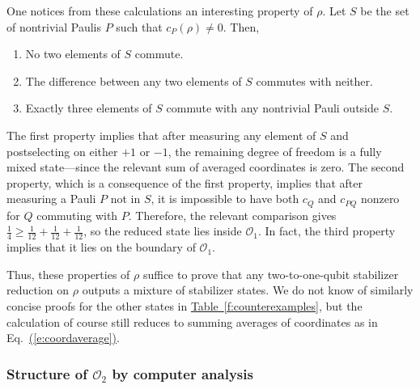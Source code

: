 \documentclass[11pt]{article}
\theoremstyle{note}
\newcommand{\eqnref}[1]{\hyperref[#1]{{(\ref*{#1})}}}
\newcommand{\tabref}[1]{\hyperref[#1]{{Table~\ref*{#1}}}}
\begin{document}
One notices from these calculations an interesting property of $\rho$.  Let $S$ be the set of nontrivial Paulis $P$ such that $c_P(\rho) \neq 0$.  Then,
\begin{enumerate}
\item No two elements of $S$ commute.
\item The difference between any two elements of $S$ commutes with neither.  
\item Exactly three elements of $S$ commute with any nontrivial Pauli outside $S$.
\end{enumerate}
The first property implies that after measuring any element of $S$ and postselecting on either $+1$ or $-1$, the remaining degree of freedom is a fully mixed state---since the relevant sum of averaged coordinates is zero.  The second property, which is a consequence of the first property, implies that after measuring a Pauli $P$ not in $S$, it is impossible to have both $c_Q$ and $c_{PQ}$ nonzero for $Q$ commuting with $P$.  Therefore, the relevant comparison gives $\tfrac{1}{4} \geq \tfrac{1}{12} + \tfrac{1}{12} + \tfrac{1}{12}$, so the reduced state lies inside $\mathcal O_1$.  In fact, the third property implies that it lies on the boundary of $\mathcal O_1$.

Thus, these properties of $\rho$ suffice to prove that any two-to-one-qubit stabilizer reduction on $\rho$ outputs a mixture of stabilizer states.  We do not know of similarly concise proofs for the other states in \tabref{f:counterexamples}, but the calculation of course still reduces to summing averages of coordinates as in Eq.~\eqnref{e:coordaverage}.


\subsubsection{Structure of $\mathcal O_2$ by computer analysis}
\end{document}
